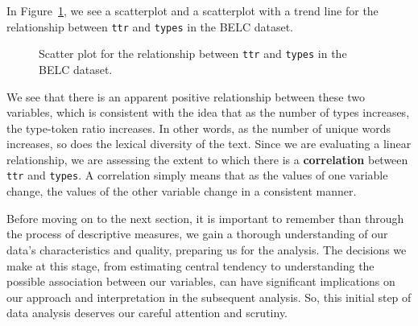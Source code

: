 \documentclass[
  letterpaper,
  DIV=11,
  numbers=noendperiod]{scrreprt}
\theoremstyle{definition}
\theoremstyle{remark}
\begin{document}
In Figure~\ref{fig-aa-belc-scatter-plot}, we see a scatterplot and a
scatterplot with a trend line for the relationship between \texttt{ttr}
and \texttt{types} in the BELC dataset.

\begin{figure}[H]

\begin{minipage}{0.50\linewidth}



\end{minipage}%
%
\begin{minipage}{0.50\linewidth}



\end{minipage}%

\caption{\label{fig-aa-belc-scatter-plot}Scatter plot for the
relationship between \texttt{ttr} and \texttt{types} in the BELC
dataset.}

\end{figure}%

We see that there is an apparent positive relationship between these two
variables, which is consistent with the idea that as the number of types
increases, the type-token ratio increases. In other words, as the number
of unique words increases, so does the lexical diversity of the text.
Since we are evaluating a linear relationship, we are assessing the
extent to which there is a \textbf{correlation} between \texttt{ttr} and
\texttt{types}. A correlation simply means that as the values of one
variable change, the values of the other variable change in a consistent
manner.

Before moving on to the next section, it is important to remember than
through the process of descriptive measures, we gain a thorough
understanding of our data's characteristics and quality, preparing us
for the analysis. The decisions we make at this stage, from estimating
central tendency to understanding the possible association between our
variables, can have significant implications on our approach and
interpretation in the subsequent analysis. So, this initial step of data
analysis deserves our careful attention and scrutiny.
\end{document}
